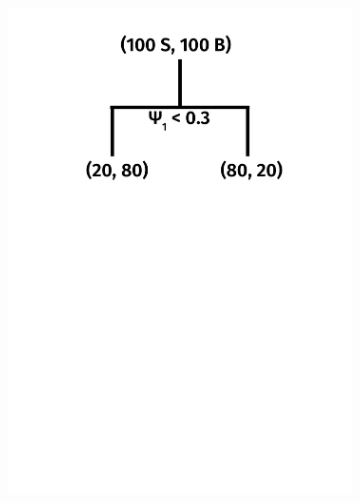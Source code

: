 \begin{figure}[]
    \begin{center}
        \begin{subfigure}[t]{0.32\textwidth}
            \includegraphics[width=\textwidth]{figures/toptagging/bdt/tree0.pdf}
            \caption{}
        \end{subfigure}
        \begin{subfigure}[t]{0.32\textwidth}

\end{subfigure}
\end{center}
\end{figure}
